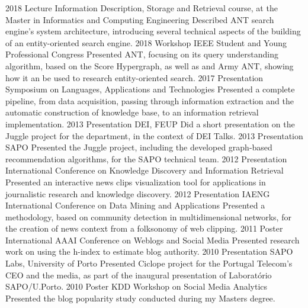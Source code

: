 \documentclass{friggeri-cv}
\begin{document}
\begin{entrylist}
\entry
{2018}
{Lecture}
{Information Description, Storage and Retrieval course, at the Master in Informatics and Computing Engineering}
{Described ANT search engine's system architecture, introducing several technical aspects of the building of an entity-oriented search engine.}
\entry
{2018}
{Workshop}
{IEEE Student and Young Professional Congress}
{Presented ANT, focusing on its query understanding algorithm, based on the Score Hypergraph, as well as and Army ANT, showing how it an be used to research entity-oriented search.}
\entry
{2017}
{Presentation}
{Symposium on Languages, Applications and Technologies}
{Presented a complete pipeline, from data acquisition, passing through information extraction and the automatic construction of knowledge base, to an information retrieval implementation.}
\entry
{2013}
{Presentation}
{DEI, FEUP}
{Did a short presentation on the Juggle project for the department, in the context of DEI Talks.}
\entry
{2013}
{Presentation}
{SAPO}
{Presented the Juggle project, including the developed graph-based recommendation algorithms, for the SAPO
technical team.}
\entry
{2012}
{Presentation}
{International Conference on Knowledge Discovery and Information Retrieval}
{Presented an interactive news clips visualization tool for applications in journalistic research and knowledge discovery.}
\entry
{2012}
{Presentation}
{IAENG International Conference on Data Mining and Applications}
{Presented a methodology, based on community detection in multidimensional networks, for the creation of news context from a folksonomy of web clipping.}
\entry
{2011}
{Poster}
{International AAAI Conference on Weblogs and Social Media}
{Presented research work on using the h-index to estimate blog authority.}
\entry
{2010}
{Presentation}
{SAPO Labs, University of Porto}
{Presented Ciclope project for the Portugal Telecom's CEO and the media, as part of the inaugural presentation of
Laboratório SAPO/U.Porto.}
\entry
{2010}
{Poster}
{KDD Workshop on Social Media Analytics}
{Presented the blog popularity study conducted during my Masters degree.}
\end{entrylist}
\end{document}
